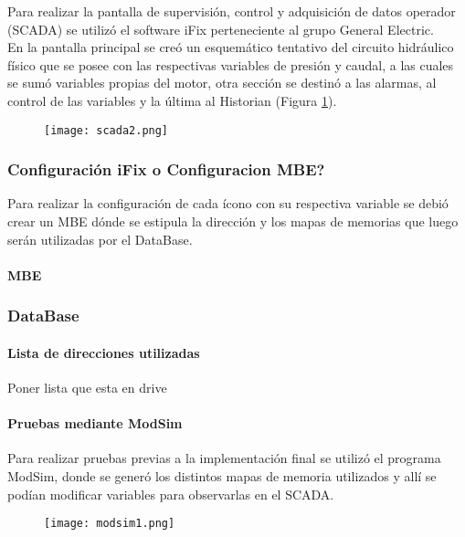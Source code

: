 Para realizar la pantalla de supervisión, control y adquisición de datos operador (SCADA) se utilizó el software iFix perteneciente al grupo General Electric.\\
En la pantalla principal se creó un esquemático tentativo del circuito hidráulico físico que se posee con las respectivas variables de presión y caudal, a las cuales se sumó variables propias del motor, otra sección se destinó a las alarmas, al control de las variables y la última al Historian (Figura \ref{fig:scada1}).

\begin{figure}[htb]
	\centering
	\texttt{[image: scada2.png]}
	\label{fig:scada1}
\end{figure}


\subsubsection{Configuración iFix o Configuracion MBE?}
Para realizar la configuración de cada ícono con su respectiva variable se debió crear un MBE dónde se estipula la dirección y los mapas de memorias que luego serán utilizadas por el DataBase. 


\paragraph{MBE}
\subsubsection{DataBase}

\paragraph{Lista de direcciones utilizadas}
Poner lista que esta en drive
\paragraph{Pruebas mediante ModSim}
Para realizar pruebas previas a la implementación final se utilizó el programa ModSim, donde se generó los distintos mapas de memoria utilizados y allí se podían modificar variables para observarlas en el SCADA.

\begin{figure}[htb]
	\centering
	\texttt{[image: modsim1.png]}
	\label{fig:modsim1}
\end{figure}

